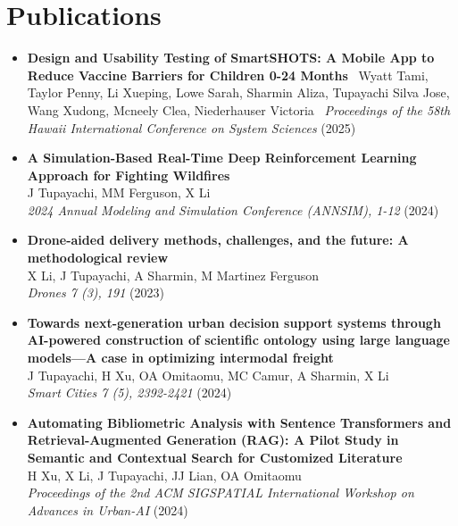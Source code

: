 \documentclass[10pt, letterpaper]{article}
\begin{document}
    \section*{Publications}
\small
    \begin{itemize}[left=0pt] %

        \item \textbf{Design and Usability Testing of SmartSHOTS: A Mobile App to Reduce Vaccine Barriers for Children 0-24 Months} \ Wyatt Tami, Taylor Penny, Li Xueping, Lowe Sarah, Sharmin Aliza, Tupayachi Silva Jose, Wang Xudong, Mcneely Clea, Niederhauser Victoria \ \textit{Proceedings of the 58th Hawaii International Conference on System Sciences} (2025) \


        \item \textbf{A Simulation-Based Real-Time Deep Reinforcement Learning Approach for Fighting Wildfires} \\
        J Tupayachi, MM Ferguson, X Li \\
        \textit{2024 Annual Modeling and Simulation Conference (ANNSIM), 1-12} (2024) \\

        \item \textbf{Drone-aided delivery methods, challenges, and the future: A methodological review} \\
        X Li, J Tupayachi, A Sharmin, M Martinez Ferguson \\
        \textit{Drones 7 (3), 191} (2023) \\
    
        \item \textbf{Towards next-generation urban decision support systems through AI-powered construction of scientific ontology using large language models—A case in optimizing intermodal freight} \\
        J Tupayachi, H Xu, OA Omitaomu, MC Camur, A Sharmin, X Li \\
        \textit{Smart Cities 7 (5), 2392-2421} (2024) \\
    
        \item \textbf{Automating Bibliometric Analysis with Sentence Transformers and Retrieval-Augmented Generation (RAG): A Pilot Study in Semantic and Contextual Search for Customized Literature} \\
        H Xu, X Li, J Tupayachi, JJ Lian, OA Omitaomu \\
        \textit{Proceedings of the 2nd ACM SIGSPATIAL International Workshop on Advances in Urban-AI} (2024) \\
    

\end{itemize}
\end{document}
